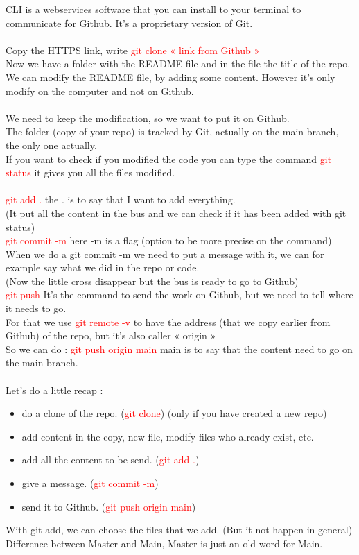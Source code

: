 \documentclass{article}
\begin{document}
CLI is a webservices software that you can install to your terminal to communicate for Github. It's a proprietary version of Git. \\ \\
Copy the HTTPS link, write \textcolor{red}{git clone « link from Github »} \\
Now we have a folder with the README file and in the file the title of the repo. \\
We can modify the README file, by adding some content. However it's only modify on the computer and not on Github. \\ \\
We need to keep the modification, so we want to put it on Github. \\
The folder (copy of your repo) is tracked by Git, actually on the main branch, the only one actually. \\
If you want to check if you modified the code you can type the command \textcolor{red}{git status} it gives you all the files modified. \\ \\
\textcolor{red}{git add .} the . is to say that I want to add everything. \\
(It put all the content in the bus and we can check if it has been added with git status) \\
\textcolor{red}{git commit -m} here -m is a flag (option to be more precise on the command) \\
When we do a git commit -m we need to put a message with it, we can for example say what we did in the repo or code. \\
(Now the little cross disappear but the bus is ready to go to Github) \\
\textcolor{red}{git push} It's the command to send the work on Github, but we need to tell where it needs to go. \\
For that we use \textcolor{red}{git remote -v} to have the address (that we copy earlier from Github) of the repo, but it's also caller « origin » \\
So we can do : \textcolor{red}{git push origin main} main is to say that the content need to go on the main branch. \\ \\
Let's do a little recap : 
\begin{itemize}
    \item do a clone of the repo. (\textcolor{red}{git clone}) (only if you have created a new repo)
    \item add content in the copy, new file, modify files who already exist, etc.
    \item add all the content to be send. (\textcolor{red}{git add .})
    \item give a message. (\textcolor{red}{git commit -m})
    \item send it to Github. (\textcolor{red}{git push origin main})
\end{itemize}
With git add, we can choose the files that we add. (But it not happen in general) \\
Difference between Master and Main, Master is just an old word for Main. \\
\newpage
\end{document}
